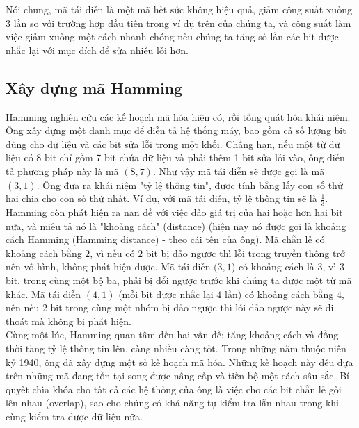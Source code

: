 \documentclass[14pt]{extreport}
\begin{document}
Nói chung, mã tái diễn là một mã hết sức không hiệu quả, giảm công suất xuống $3$ lần so với trường hợp đầu tiên trong ví dụ trên của chúng ta, và công suất làm việc giảm xuống một cách nhanh chóng nếu chúng ta tăng số lần các bit được nhắc lại với mục đích để sửa nhiều lỗi hơn.
\subsection{Xây dựng mã Hamming}
Hamming nghiên cứu các kế hoạch mã hóa hiện có, rồi tổng quát hóa khái niệm. Ông xây dựng một danh mục để diễn tả hệ thống máy, bao gồm cả số lượng bit dùng cho dữ liệu và các bit sửa lỗi trong một khối. Chẳng hạn, nếu một từ dữ liệu có 8 bit chỉ gồm 7 bit chứa dữ liệu và phải thêm 1 bit sửa lỗi vào, ông diễn tả phương pháp này là mã $(8, 7)$. Như vậy mã tái diễn sẽ được gọi là mã $(3, 1)$. Ông đưa ra khái niệm "tỷ lệ thông tin", được tính bằng lấy con số thứ hai chia cho con số thứ nhất. Ví dụ, với mã tái diễn, tỷ lệ thông tin sẽ là $\frac{1}{3}$.\\

Hamming còn phát hiện ra nan đề với việc đảo giá trị của hai hoặc hơn hai bit nữa, và miêu tả nó là "khoảng cách" (distance) (hiện nay nó được gọi là khoảng cách Hamming (Hamming distance) - theo cái tên của ông). Mã chẵn lẻ có khoảng cách bằng $2$, vì nếu có $2$ bit bị đảo ngược thì lỗi trong truyền thông trở nên vô hình, không phát hiện được. Mã tái diễn $(3,1$) có khoảng cách là $3$, vì $3$ bit, trong cùng một bộ ba, phải bị đổi ngược trước khi chúng ta được một từ mã khác. Mã tái diễn $(4,1)$ (mỗi bit được nhắc lại $4$ lần) có khoảng cách bằng $4$, nên nếu $2$ bit trong cùng một nhóm bị đảo ngược thì lỗi đảo ngược này sẽ đi thoát mà không bị phát hiện.\\

Cùng một lúc, Hamming quan tâm đến hai vấn đề; tăng khoảng cách và đồng thời tăng tỷ lệ thông tin lên, càng nhiều càng tốt. Trong những năm thuộc niên kỷ 1940, ông đã xây dựng một số kế hoạch mã hóa. Những kế hoạch này đều dựa trên những mã đang tồn tại song được nâng cấp và tiến bộ một cách sâu sắc. Bí quyết chìa khóa cho tất cả các hệ thống của ông là việc cho các bit chẵn lẻ gối lên nhau (overlap), sao cho chúng có khả năng tự kiểm tra lẫn nhau trong khi cùng kiểm tra được dữ liệu nữa.
\end{document}
